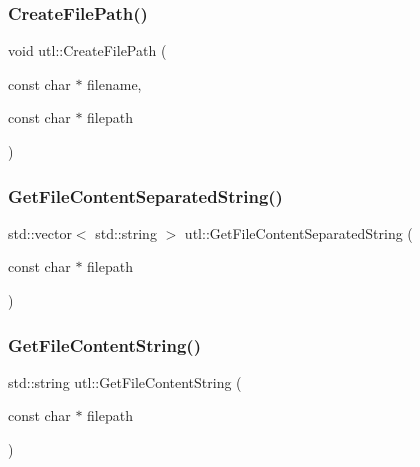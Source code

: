 \mbox{\label{namespaceutl_abf27aab9016dc2fb9f8b8049644276d7}} 
\subsubsection{\texorpdfstring{Create\+File\+Path()}{CreateFilePath()}}
{\footnotesize\ttfamily void utl\+::\+Create\+File\+Path (\begin{DoxyParamCaption}\item[{const char $\ast$}]{filename,  }\item[{const char $\ast$}]{filepath }\end{DoxyParamCaption})}

\mbox{\label{namespaceutl_a43da5b11cd73ebbd81588991b1971a42}} 
\subsubsection{\texorpdfstring{Get\+File\+Content\+Separated\+String()}{GetFileContentSeparatedString()}}
{\footnotesize\ttfamily std\+::vector$<$ std\+::string $>$ utl\+::\+Get\+File\+Content\+Separated\+String (\begin{DoxyParamCaption}\item[{const char $\ast$}]{filepath }\end{DoxyParamCaption})}

\mbox{\label{namespaceutl_ae679726d5c99421e9628a5f8e29197de}} 
\subsubsection{\texorpdfstring{Get\+File\+Content\+String()}{GetFileContentString()}}
{\footnotesize\ttfamily std\+::string utl\+::\+Get\+File\+Content\+String (\begin{DoxyParamCaption}\item[{const char $\ast$}]{filepath }\end{DoxyParamCaption})}

